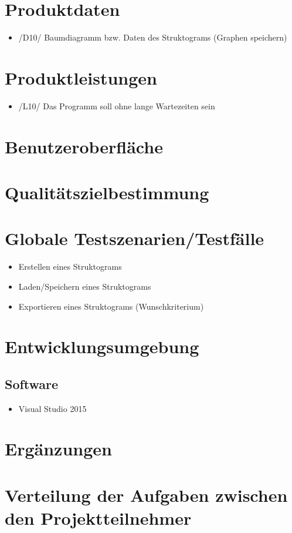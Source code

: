 \documentclass[a4paper,10pt]{report}
\begin{document}
\section{Produktdaten}
\begin{itemize}
\item /D10/ Baumdiagramm bzw. Daten des Struktograms (Graphen speichern)
\end{itemize}
\section{Produktleistungen}
\begin{itemize}
\item /L10/ Das Programm soll ohne lange Wartezeiten sein
\end{itemize}
\section{Benutzeroberfläche}
\section{Qualitätszielbestimmung}

\section{Globale Testszenarien/Testfälle}
\begin{itemize}
\item  Erstellen eines Struktograms
\item  Laden/Speichern eines Struktograms
\item  Exportieren eines Struktograms (Wunschkriterium)
\end{itemize}
\section{Entwicklungsumgebung}
\subsection{Software}
\begin{itemize}
\item Visual Studio 2015
\end{itemize}
\section{Ergänzungen}
\section{Verteilung der Aufgaben zwischen den Projektteilnehmer}
\end{document}
